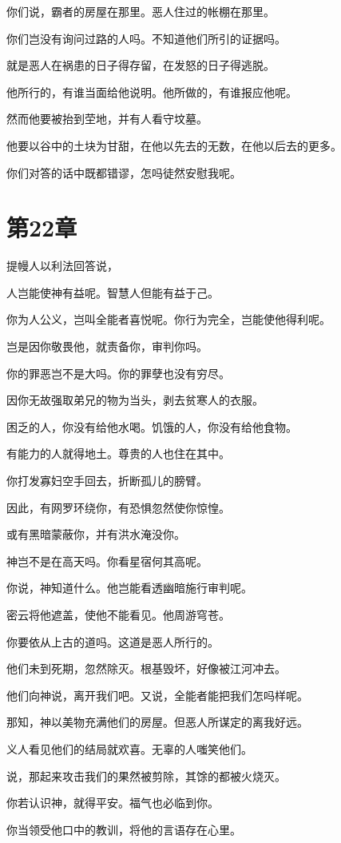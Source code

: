 \documentclass[12pt,oneside]{book}
\begin{document}
你们说，霸者的房屋在那里。恶人住过的帐棚在那里。

你们岂没有询问过路的人吗。不知道他们所引的证据吗。

就是恶人在祸患的日子得存留，在发怒的日子得逃脱。

他所行的，有谁当面给他说明。他所做的，有谁报应他呢。

然而他要被抬到茔地，并有人看守坟墓。

他要以谷中的土块为甘甜，在他以先去的无数，在他以后去的更多。

你们对答的话中既都错谬，怎吗徒然安慰我呢。


\chapter{第22章}
提幔人以利法回答说，

人岂能使神有益呢。智慧人但能有益于己。

你为人公义，岂叫全能者喜悦呢。你行为完全，岂能使他得利呢。

岂是因你敬畏他，就责备你，审判你吗。

你的罪恶岂不是大吗。你的罪孽也没有穷尽。

因你无故强取弟兄的物为当头，剥去贫寒人的衣服。

困乏的人，你没有给他水喝。饥饿的人，你没有给他食物。

有能力的人就得地土。尊贵的人也住在其中。

你打发寡妇空手回去，折断孤儿的膀臂。

因此，有网罗环绕你，有恐惧忽然使你惊惶。

或有黑暗蒙蔽你，并有洪水淹没你。

神岂不是在高天吗。你看星宿何其高呢。

你说，神知道什么。他岂能看透幽暗施行审判呢。

密云将他遮盖，使他不能看见。他周游穹苍。

你要依从上古的道吗。这道是恶人所行的。

他们未到死期，忽然除灭。根基毁坏，好像被江河冲去。

他们向神说，离开我们吧。又说，全能者能把我们怎吗样呢。

那知，神以美物充满他们的房屋。但恶人所谋定的离我好远。

义人看见他们的结局就欢喜。无辜的人嗤笑他们。

说，那起来攻击我们的果然被剪除，其馀的都被火烧灭。

你若认识神，就得平安。福气也必临到你。

你当领受他口中的教训，将他的言语存在心里。
\end{document}
